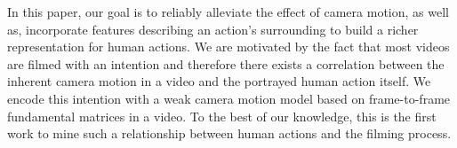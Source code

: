 In this paper, our goal is to reliably alleviate the effect of camera motion, as well as, incorporate features describing an action's surrounding to build a richer representation for human actions. We are motivated by the fact that most videos are filmed with an intention and therefore there exists a correlation between the inherent camera motion in a video and the portrayed human action itself. We encode this intention with a weak camera motion model based on frame-to-frame fundamental matrices in a video. To the best of our knowledge, this is the first work to mine such a relationship between human actions and the filming process.








%
